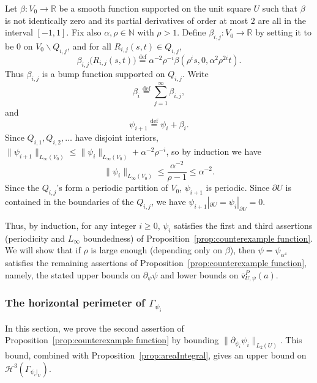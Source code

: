 \documentclass[11pt,reqno]{amsart}
\newcommand{\N}{\mathbb{N}}
\newcommand{\R}{\mathbb{R}}
\newcommand{\cH}{\mathcal{H}}
\newcommand{\0}{\mathbf{0}}
\renewcommand{\1}{\mathbf 1}
\newcommand{\from}{\colon}
\newcommand{\eqdef}{\stackrel{\mathrm{def}}{=}}
\renewcommand{\ge}{\geqslant}
\renewcommand{\le}{\leqslant}
\renewcommand{\setminus}{\smallsetminus}
\theoremstyle{remark}
\newcommand{\vpP}[1]{{\overline{\mathsf{v}}^{P}_{\!#1}}}
\begin{document}
Let $\beta\from V_0\to \R$ be a smooth function supported on the unit square $U$ such that $\beta$ is not identically zero and its partial derivatives of order at most $2$ are all in the interval $[-1,1]$. Fix also $\alpha,\rho\in \N$ with $\rho>1$.
Define $\beta_{i,j}\from V_0\to \R$ by setting it to be $0$ on $V_0\setminus Q_{i,j}$, and for all $R_{i,j}(s,t)\in Q_{i,j}$,
\begin{equation}\label{eq:def beta ij}
\beta_{i,j}\big(R_{i,j}(s,t)\big)\eqdef \alpha^{-2}\rho^{-i} \beta(\rho^is,0,\alpha^2\rho^{2i}t).
\end{equation}
Thus $\beta_{i,j}$ is a bump function supported on $Q_{i,j}$. Write
\begin{equation}\label{eq:def beta i}
\beta_i\eqdef \sum_{j=1}^\infty \beta_{i,j},
\end{equation}
and
\begin{equation}\label{eq:recurse psi}
\psi_{i+1}\eqdef \psi_i+\beta_i.
\end{equation}
Since $Q_{i,1},Q_{i,2},\ldots $ have disjoint interiors, $\|\psi_{i+1}\|_{L_\infty(V_0)}\le \|\psi_{i}\|_{L_\infty(V_0)} + \alpha^{-2}\rho^{-i}$, so by induction we have
\begin{equation}\label{eq:L infty psi i}
\|\psi_{i}\|_{L_\infty(V_0)}\le \frac{\alpha^{-2}}{\rho-1}\le \alpha^{-2}.
\end{equation}
Since the $Q_{i,j}$'s form a periodic partition of $V_0$, $\psi_{i+1}$ is periodic.
Since $\partial U$ is contained in the boundaries of the $Q_{i,j}$, we have $\psi_{i+1}|_{\partial U}=\psi_i|_{\partial U}=0$.

Thus, by induction, for any integer  $i\ge 0$, $\psi_i$ satisfies the first and third assertions (periodicity and $L_\infty$ boundedness) of Proposition~\ref{prop:counterexample function}.  We will show that if $\rho$ is large enough (depending only on $\beta$), then $\psi=\psi_{\alpha^4}$ satisfies the remaining assertions of Proposition~\ref{prop:counterexample function}, namely, the stated upper bounds on $\partial_\psi \psi$ and lower bounds on $\vpP{U,\psi}(a)$.

\subsubsection{The horizontal perimeter of $\Gamma_{\psi_i}$}\label{sec: per of example}

In this section, we prove the second assertion of Proposition~\ref{prop:counterexample function} by bounding $\|\partial_{\psi_i}\psi_i\|_{L_2(U)}$.  This bound, combined with Proposition~\ref{prop:areaIntegral}, gives an upper bound on $\cH^3(\Gamma_{\psi_i|_U})$.
\end{document}
